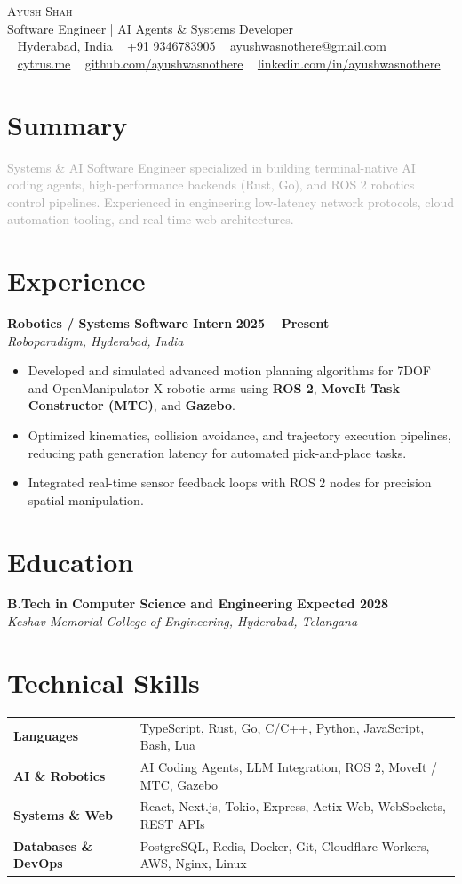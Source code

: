 \documentclass[a4paper,10pt]{article}
\makeatletter
\newcommand{\icon}[1]{\textcolor{lightgray}{#1}}
\newcommand{\resumeHeader}{
    \begin{center}
        {\Huge \scshape Ayush Shah}\\[4pt]
        \large\textcolor{midgray}{Software Engineer | AI Agents \& Systems Developer}\\[6pt]
        \small
        \icon{\faMapMarker} ~ Hyderabad, India \quad \textbullet \quad
        \icon{\faPhone} ~ +91 9346783905 \quad \textbullet \quad
        \icon{\faEnvelope} ~ \href{mailto:ayushwasnothere@gmail.com}{ayushwasnothere@gmail.com}\\[4pt]
        \icon{\faGlobe} ~ \href{https://cytrus.me}{cytrus.me} \quad \textbullet \quad
        \icon{\faGithub} ~ \href{https://github.com/ayushwasnothere}{github.com/ayushwasnothere} \quad \textbullet \quad
        \icon{\faLinkedin} ~ \href{https://linkedin.com/in/ayushwasnothere}{linkedin.com/in/ayushwasnothere}
    \end{center}
}
\makeatother
\begin{document}
\resumeHeader

\section*{Summary}
\textcolor{darkgray}{Systems \& AI Software Engineer specialized in building terminal-native AI coding agents, high-performance backends (Rust, Go), and ROS 2 robotics control pipelines. Experienced in engineering low-latency network protocols, cloud automation tooling, and real-time web architectures.}

\section*{Experience}
\noindent\textbf{\large Robotics / Systems Software Intern} \hfill \textbf{2025 -- Present} \\
\textit{Roboparadigm, Hyderabad, India}
\begin{itemize}[leftmargin=1.2em, itemsep=2.5pt, topsep=2pt]
    \item Developed and simulated advanced motion planning algorithms for 7DOF and OpenManipulator-X robotic arms using \textbf{ROS 2}, \textbf{MoveIt Task Constructor (MTC)}, and \textbf{Gazebo}.
    \item Optimized kinematics, collision avoidance, and trajectory execution pipelines, reducing path generation latency for automated pick-and-place tasks.
    \item Integrated real-time sensor feedback loops with ROS 2 nodes for precision spatial manipulation.
\end{itemize}

\section*{Education}
\textbf{B.Tech in Computer Science and Engineering} \hfill \textbf{Expected 2028} \\
\textit{Keshav Memorial College of Engineering, Hyderabad, Telangana}

\section*{Technical Skills}
\begin{tabular}{@{}p{} p{}}
    \textbf{Languages} & TypeScript, Rust, Go, C/C++, Python, JavaScript, Bash, Lua \\
    \textbf{AI \& Robotics} & AI Coding Agents, LLM Integration, ROS 2, MoveIt / MTC, Gazebo \\
    \textbf{Systems \& Web} & React, Next.js, Tokio, Express, Actix Web, WebSockets, REST APIs \\
    \textbf{Databases \& DevOps} & PostgreSQL, Redis, Docker, Git, Cloudflare Workers, AWS, Nginx, Linux \\
\end{tabular}
\end{document}
